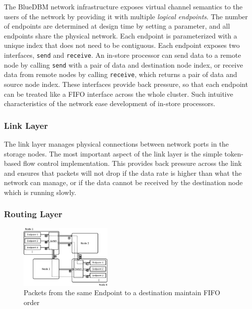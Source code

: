 The BlueDBM network infrastructure exposes virtual channel semantics to the
users of the network by providing it with multiple \emph{logical endpoints}.  The
number of endpoints are determined at design time by setting a parameter, and
all endpoints share the physical network.  Each endpoint is parameterized with a
unique index that does not need to be contiguous.  Each endpoint exposes two
interfaces, \texttt{send} and \texttt{receive}. An in-store processor can send
data to a remote node by calling \texttt{send} with a pair of data and
destination node index, or receive data from remote nodes by calling
\texttt{receive}, which returns a pair of data and source node index. These
interfaces provide back pressure, so that each endpoint can be treated like a
FIFO interface across the whole cluster. Such intuitive characteristics of the
network ease development of in-store processors.

\subsubsection{Link Layer}

The link layer manages physical connections between network ports in the storage
nodes. The most important aspect of the link layer is the simple token-based
flow control implementation. This provides back pressure across the link and
ensures that packets will not drop if the data rate is higher than what the
network can manage, or if the data cannot be received by the destination node which is running slowly.

\subsubsection{Routing Layer}


\begin{figure}[h]
	\begin{center}
	\includegraphics[width=0.40\textwidth]{figures/routing-crop.pdf}
	\caption{Packets from the same Endpoint to a destination maintain FIFO
	order}
	\label{fig:networkrouting}
	\end{center}
\end{figure}

